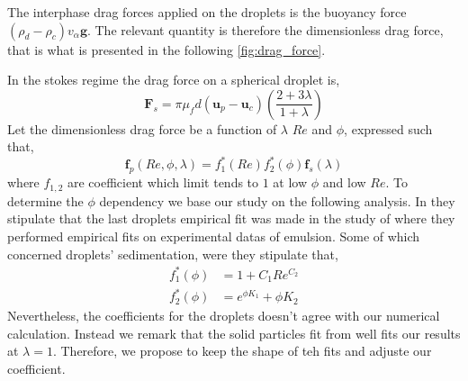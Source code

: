 
The interphase drag forces applied on the droplets is the buoyancy force $(\rho_d-\rho_c)v_\alpha \textbf{g}$.
The relevant quantity is therefore the dimensionless drag force, that is what is presented in the following \ref{fig:drag_force}. 


In the stokes regime the drag force on a spherical droplet is, 
\begin{equation*}
    \textbf{F}_s
    =\pi \mu_f d (\textbf{u}_p - \textbf{u}_c) \left(\frac{2+3\lambda}{1+\lambda}\right)
\end{equation*}
Let the dimensionless drag force be a function of $\lambda$ $Re$ and $\phi$, expressed such that, 
\begin{equation}
    \textbf{f}_p(Re,\phi,\lambda)
    = 
    f_1^*(Re)
    f_2^*(\phi)
    \textbf{f}_s(\lambda)
\end{equation}
where $f_{1,2}$ are coefficient which limit tends to $1$ at low $\phi$ and low $Re$. 
To determine the $\phi$ dependency we base our study on the following analysis. 
In \cite[chapter 4]{ashgriz2011handbook} they stipulate that the last droplets empirical fit was made in the study of \citet{rusche2000effect} where they performed empirical fits on experimental datas of emulsion. 
Some of which concerned droplets' sedimentation, were they stipulate that, 
\begin{align*}
    f_1^*(\phi) 
    &=1  + C_1 Re^{C_2}\\
    f_2^*(\phi) 
    &= e^{\phi K_1} + \phi K_2
    \label{eq:drag_fit}
\end{align*}
Nevertheless, the coefficients for the droplets doesn't agree with our numerical calculation. 
Instead we remark that the solid particles fit from \citet{rusche2000effect} well fits our results at $\lambda = 1$. 
Therefore, we propose to keep the shape of teh fits and adjuste our coefficient. 

